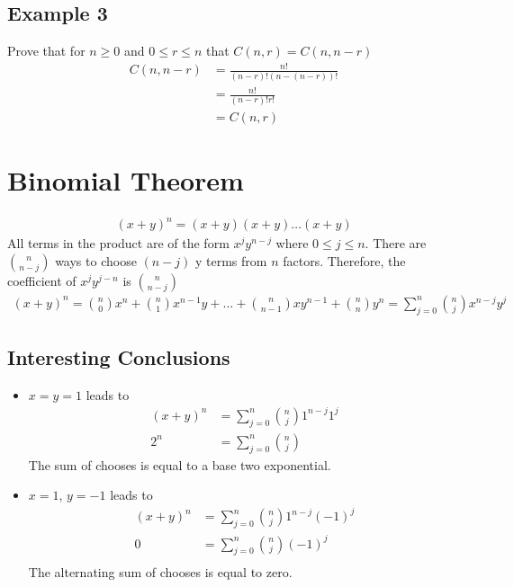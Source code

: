 \documentclass{article}
\theoremstyle{mytheoremstyle}
\theoremstyle{mytheoremstyle}
\theoremstyle{myproblemstyle}
\begin{document}
    \subsection*{Example 3}
    Prove that for $n\ge 0$ and $0\le r\le n$ that $C(n,r)=C(n,n-r)$
    \begin{align*}
        C(n,n-r) &= \frac{n!}{(n-r)!(n-(n-r))!} \\
                 &= \frac{n!}{(n-r)!r!} \\
                 &= C(n,r)
    \end{align*}

    \section*{Binomial Theorem}
    \begin{align*}
        (x+y)^n = (x+y)(x+y)\dots(x+y)
    \end{align*}
    All terms in the product are of the form $x^jy^{n-j}$ where $0 \le j \le n$.
    There are $\binom{n }{n-j}$ ways to choose $(n-j)$ y terms from $n$ factors.
    Therefore, the coefficient of $x^jy^{j-n}$ is $\binom{n }{n-j}$
    \begin{align*}
        (x+y)^n = 
        \binom{n}{0}x^n+
        \binom{n}{1}x^{n-1}y+
        \dots+
        \binom{n}{n-1}xy^{n-1}+
        {\binom{n}{n}}y^n =
        \sum_{j=0}^{n} {\binom{n}{j}}x^{n-j}y^j
    \end{align*}

    \subsection*{Interesting Conclusions}
    \begin{itemize}
        \item $x=y=1$ leads to
            \begin{align*}
                (x+y)^n &= \sum_{j=0}^{n} \binom{n}{j}1^{n-j}1^j \\
                2^n &= \sum_{j=0}^{n} \binom{n}{j}
            \end{align*}
            The sum of chooses is equal to a base two exponential.
        \item $x=1$, $y=-1$ leads to
            \begin{align*}
                (x+y)^n &= \sum_{j=0}^{n} \binom{n}{j}1^{n-j}(-1)^j \\
                0 &= \sum_{j=0}^{n} \binom{n}{j}(-1)^j \\
            \end{align*}
            The alternating sum of chooses is equal to zero.
    \end{itemize}
\end{document}
